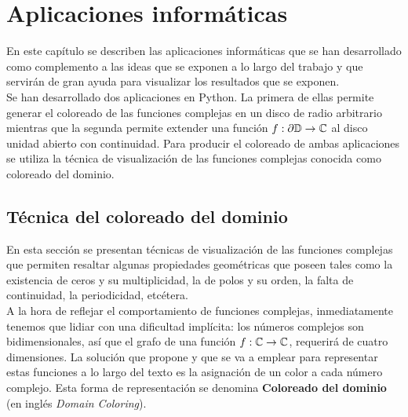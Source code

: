 \chapter{Aplicaciones informáticas}


En este capítulo se describen las aplicaciones informáticas que se han desarrollado como complemento a las ideas que se exponen a lo largo del trabajo y que servirán de gran ayuda para visualizar los resultados que se exponen. \\

Se han desarrollado dos aplicaciones en Python. La primera de ellas permite generar el coloreado de las funciones complejas en un disco de radio arbitrario mientras que la segunda permite extender una función $f: \partial \mathbb{D} \to \mathbb{C}$ al disco unidad abierto con continuidad. Para producir el coloreado de ambas aplicaciones se utiliza la técnica de visualización de las funciones complejas conocida como coloreado del dominio. \\


\section{Técnica del coloreado del dominio}

En esta sección se presentan técnicas de visualización de las funciones complejas que permiten resaltar algunas propiedades geométricas que poseen tales como la existencia de ceros y su multiplicidad, la de polos y su orden, la falta de continuidad, la periodicidad, etcétera. \\

A la hora de reflejar el comportamiento de funciones complejas, inmediatamente tenemos que lidiar con una dificultad implícita: los números complejos son bidimensionales, así que el grafo de una función $f : \mathbb{C} \to \mathbb{C}$, requerirá de cuatro dimensiones. La solución que propone \cite{Velleman2015} y que se va a emplear para representar estas funciones a lo largo del texto es la asignación de un color a cada número complejo. Esta forma de representación se denomina \textbf{Coloreado del dominio} (en inglés \textit{Domain Coloring}). \\

